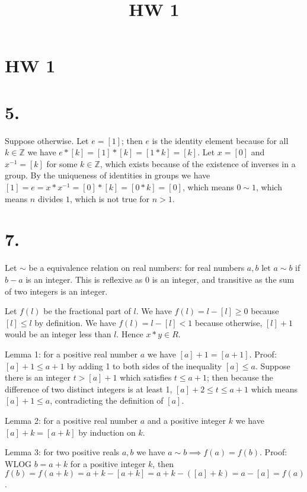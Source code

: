 \documentclass{article}
\title{HW 1}
\date{}
\def\Z{\mathbb{Z}}
\begin{document}
\maketitle

\section*{HW 1}

\section*{5.}

Suppose otherwise. Let $e = [1]$; then $e$ is the identity element because for all $k \in \Z$ we have $e*[k] = [1]*[k] = [1*k] = [k]$. Let $x=[0]$ and $x^{-1}=[k]$ for some $k \in \Z$, which exists because of the existence of inverses in a group. By the uniqueness of identities in groups we have $[1] = e = x*x^{-1} = [0]*[k] = [0*k] = [0]$, which means $0 \sim 1$, which means $n$ divides $1$, which is not true for $n>1$.

\section*{7.}

Let $\sim$ be a equivalence relation on real numbers: for real numbers $a, b$ let $a \sim b$ if $b - a$ is an integer. This is reflexive as $0$ is an integer, and transitive as the sum of two integers is an integer.

Let $f(l)$ be the fractional part of $l$. We have $f(l) = l - [l] \ge 0$ because $[l] \le l$ by definition. We have $f(l) = l - [l] < 1$ because otherwise, $[l]+1$ would be an integer less than $l$. Hence $x * y \in R$.

Lemma 1: for a positive real number $a$ we have $[a]+1 = [a+1]$. Proof: $[a]+1 \le a+1$ by adding 1 to both sides of the inequality $[a] \le a$. Suppose there is an integer $t > [a]+1$ which satisfies $t \le a+1$; then because the difference of two distinct integers is at least 1, $[a]+2 \le t \le a+1$ which means $[a] + 1 \le a$, contradicting the definition of $[a]$.

Lemma 2: for a positive real number $a$ and a positive integer $k$ we have $[a]+k = [a+k]$ by induction on $k$.

Lemma 3: for two positive reals $a, b$ we have $a \sim b \implies f(a) = f(b)$. Proof: WLOG $b = a+k$ for a positive integer $k$, then $f(b) = f(a+k) = a+k - [a+k] = a+k - ([a] + k) = a - [a] = f(a)$.
\end{document}

